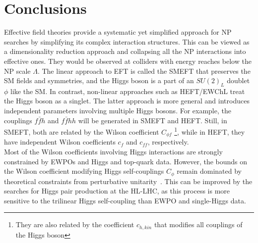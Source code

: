 \section{Conclusions \label{sec:concefts}}
Effective field theories provide a systematic yet simplified approach for NP searches by simplifying its complex interaction structures. This can be viewed as a dimensionality reduction approach and collapsing all the NP interactions into effective ones. They would be observed at colliders with energy reaches below the NP scale $\Lambda$. The linear approach to EFT is called the SMEFT that preserves the SM fields and symmetries, and the Higgs boson is a part of an $SU(2)_L$ doublet $\phi$ like the SM. In contrast, non-linear approaches such as HEFT/EWChL treat the Higgs boson as a singlet. The latter approach is more general and introduces independent parameters involving multiple Higgs bosons. For example, the couplings $f\bar f h$ and $ f\bar f hh$ will be generated in SMEFT and HEFT. Still, in SMEFT, both are related by the Wilson coefficient $C_{\phi f}$ \footnote{They are also related by the coefficient $c_{h,kin}$ that modifies all couplings of the Higgs boson}, while in HEFT, they have independent  Wilson coefficients $c_f$ and $c_{ff}$, respectively. \\  Most of the Wilson coefficients involving Higgs interactions are strongly constrained by EWPOs and Higgs and top-quark data. However, the bounds on the Wilson coefficient modifying Higgs self-couplings $C_\phi$ remain dominated by theoretical constraints from perturbative unitarity~\cite{DiLuzio:2017tfn,DiVita:2017vrr}. This can be improved by the searches for Higgs pair production at the HL-LHC, as this process is more sensitive to the trilinear Higgs self-coupling than EWPO and single-Higgs data.
